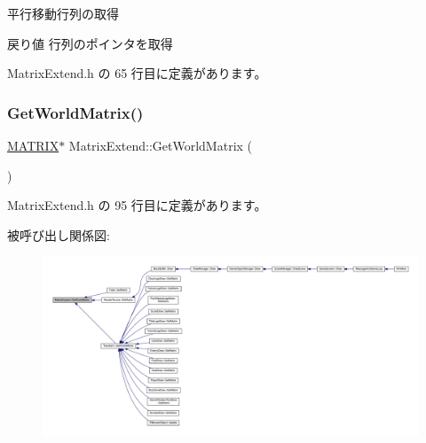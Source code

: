 平行移動行列の取得 

\begin{DoxyReturn}{戻り値}
行列のポインタを取得 
\end{DoxyReturn}


 Matrix\+Extend.\+h の 65 行目に定義があります。

\mbox{\label{class_matrix_extend_a1a88845d1b9da14c33c91fa8da2e3a15}} 
\subsubsection{\texorpdfstring{Get\+World\+Matrix()}{GetWorldMatrix()}}
{\footnotesize\ttfamily \mbox{\hyperlink{_vector3_d_8h_a032295cd9fb1b711757c90667278e744}{M\+A\+T\+R\+IX}}$\ast$ Matrix\+Extend\+::\+Get\+World\+Matrix (\begin{DoxyParamCaption}{ }\end{DoxyParamCaption})\hspace{0.3cm}{\ttfamily [inline]}}



 Matrix\+Extend.\+h の 95 行目に定義があります。

被呼び出し関係図\+:
\nopagebreak
\begin{figure}[H]
\begin{center}
\leavevmode
\includegraphics[width=350pt]{class_matrix_extend_a1a88845d1b9da14c33c91fa8da2e3a15_icgraph}
\end{center}
\end{figure}
\mbox{\label{class_matrix_extend_a1847728feb977bd7ccdf1987953fe203}} 
